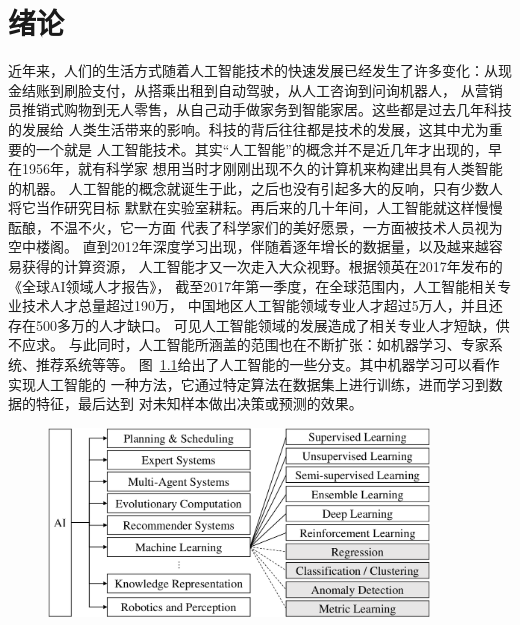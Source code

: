 \chapter{绪论}\label{chap:introduction}
近年来，人们的生活方式随着人工智能技术的快速发展已经发生了许多变化：从现金结账到刷脸支付，从搭乘出租到自动驾驶，从人工咨询到问询机器人，
从营销员推销式购物到无人零售，从自己动手做家务到智能家居。这些都是过去几年科技的发展给
人类生活带来的影响。科技的背后往往都是技术的发展，这其中尤为重要的一个就是
人工智能技术。其实``人工智能''的概念并不是近几年才出现的，早在1956年，就有科学家
想用当时才刚刚出现不久的计算机来构建出具有人类智能的机器。
人工智能的概念就诞生于此，之后也没有引起多大的反响，只有少数人将它当作研究目标
默默在实验室耕耘。再后来的几十年间，人工智能就这样慢慢酝酿，不温不火，它一方面
代表了科学家们的美好愿景，一方面被技术人员视为空中楼阁。
直到2012年深度学习出现，伴随着逐年增长的数据量，以及越来越容易获得的计算资源，
人工智能才又一次走入大众视野。根据领英在2017年发布的《全球AI领域人才报告》，
截至2017年第一季度，在全球范围内，人工智能相关专业技术人才总量超过190万，
中国地区人工智能领域专业人才超过5万人，并且还存在500多万的人才缺口。
可见人工智能领域的发展造成了相关专业人才短缺，供不应求。
与此同时，人工智能所涵盖的范围也在不断扩张：如机器学习、专家系统、推荐系统等等。
图~\ref{fig:ai}给出了人工智能的一些分支。其中机器学习可以看作实现人工智能的
一种方法，它通过特定算法在数据集上进行训练，进而学习到数据的特征，最后达到
对未知样本做出决策或预测的效果。
\begin{figure}[htbp]
  \centering
  \includegraphics[width=0.9\textwidth]{Img/ai-content.pdf}
  \label{fig:ai}
\end{figure}

